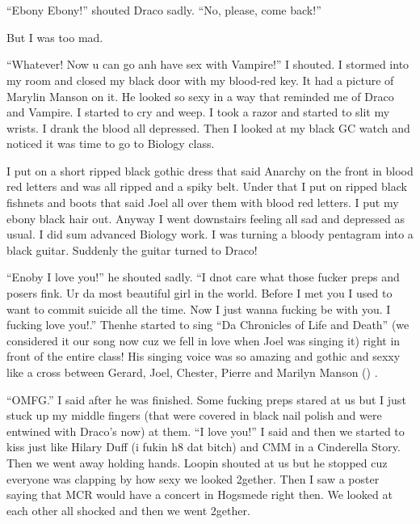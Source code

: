 \section{\chaptername~\thesection}



\enquote{Ebony Ebony!} shouted Draco sadly. \enquote{No, please, come back!}

But I was too mad.

\begin{sloppypar}
    \enquote{Whatever! Now u can go anh have sex with Vampire!} I shouted. I stormed into my room and closed my black door with my blood-red key. It had a picture of Marylin Manson on it. He looked so sexy in a way that reminded me of Draco and Vampire. I started to cry and weep. I took a razor and started to slit my wrists. I drank the blood all depressed. Then I looked at my black GC watch and noticed it was time to go to Biology class.    
\end{sloppypar}

I put on a short ripped black gothic dress that said Anarchy on the front in blood red letters and was all ripped and a spiky belt. Under that I put on ripped black fishnets and boots that said Joel all over them with blood red letters. I put my ebony black hair out. Anyway I went downstairs feeling all sad and depressed as usual. I did sum advanced Biology work. I was turning a bloody pentagram into a black guitar. Suddenly the guitar turned to Draco!

\enquote{Enoby I love you!} he shouted sadly. \enquote{I dnot care what those fucker preps and posers fink. Ur da most beautiful girl in the world. Before I met you I used to want to commit suicide all the time. Now I just wanna fucking be with you. I fucking love you!.} Then\dotfill he started to sing \enquote{Da Chronicles of Life and Death} (we considered it our song now cuz we fell in love when Joel was singing it) right in front of the entire class! His singing voice was so amazing and gothic and sexxy like a cross between Gerard, Joel, Chester, Pierre and Marilyn Manson () .

\enquote{OMFG.} I said after he was finished. Some fucking preps stared at us but I just stuck up my middle fingers (that were covered in black nail polish and were entwined with Draco's now) at them. \enquote{I love you!} I said and then we started to kiss just like Hilary Duff (i fukin h8 dat bitch) and CMM in a Cinderella Story. Then we went away holding hands. Loopin shouted at us but he stopped cuz everyone was clapping by how sexy we looked 2gether. Then I saw a poster saying that MCR would have a concert in Hogsmede right then. We looked at each other all shocked and then we went 2gether.
